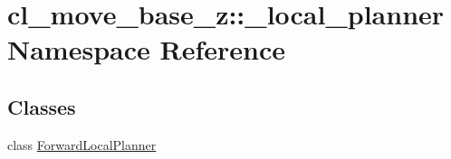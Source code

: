 \hypertarget{namespacecl__move__base__z_1_1__local__planner}{}\section{cl\+\_\+move\+\_\+base\+\_\+z\+:\+:\+\_\+local\+\_\+planner Namespace Reference}
\label{namespacecl__move__base__z_1_1__local__planner}
\subsection*{Classes}
\begin{DoxyCompactItemize}
\item 
class \hyperlink{classcl__move__base__z_1_1__local__planner_1_1ForwardLocalPlanner}{Forward\+Local\+Planner}
\end{DoxyCompactItemize}
